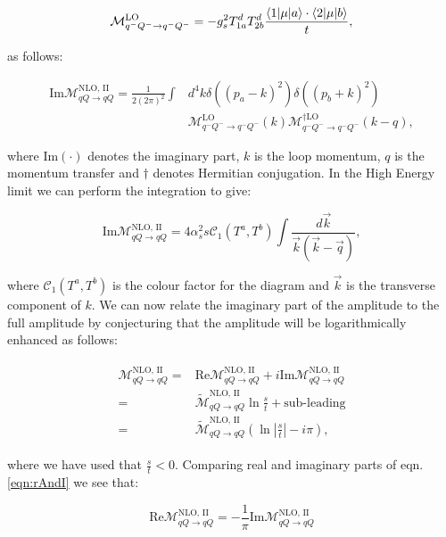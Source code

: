 		\begin{equation}
			\mathcal{M}_{q^-Q^-\rightarrow q^-Q^-}^{\text{LO}} = -g_s^2T^d_{1a}T^d_{2b}\frac{\langle 1 | \mu | a \rangle\cdot\langle 2 | \mu | b \rangle}{t},
		\end{equation}

		as follows:

		\begin{align}
			\text{Im}\mathcal{M}_{qQ\rightarrow qQ}^{\text{NLO, II}} = \frac{1}{2(2\pi)^2}\int &d^4k\delta((p_a-k)^2)
			\delta((p_b+k)^2)\\ &\mathcal{M}_{q^-Q^-\rightarrow q^-Q^-}^{\text{LO}}(k)
			\mathcal{M}_{q^-Q^-\rightarrow q^-Q^-}^{\dagger\text{LO}}(k-q),
		\end{align}

		where $\text{Im}(\cdot)$ denotes the imaginary part, $k$ is the loop momentum, $q$ is the momentum
		transfer and $\dagger$ denotes Hermitian conjugation.  In the High Energy limit we can perform the
		integration to give:

		\begin{equation}
			\text{Im}\mathcal{M}_{qQ\rightarrow qQ}^{\text{NLO, II}} = 4\alpha_s^2 s\mathcal{C}_1(T^a,T^b)
			\int \frac{d\vec{k}}{\vec{k}(\vec{k} - \vec{q})},
		\end{equation}

		where $\mathcal{C}_1(T^a,T^b)$ is the colour factor for the diagram and $\vec{k}$ is the transverse
		component of $k$.  We can now relate the imaginary part of the amplitude to the full amplitude by
		conjecturing that the amplitude will be logarithmically enhanced as follows:

		\begin{align}
		\begin{split}
			\mathcal{M}_{qQ\rightarrow qQ}^{\text{NLO, II}} = &\text{Re}\mathcal{M}_{qQ\rightarrow qQ}^{\text{NLO, II}} +
			i\text{Im}\mathcal{M}_{qQ\rightarrow qQ}^{\text{NLO, II}}\\
			=&\widetilde{\mathcal{M}}_{qQ\rightarrow qQ}^{\text{NLO, II}}\ln\frac{s}{t} + \text{sub-leading}\\
			=&\widetilde{\mathcal{M}}_{qQ\rightarrow qQ}^{\text{NLO, II}}\left(\ln\left|\frac{s}{t}\right| -i\pi\right),
			\label{eqn:rAndI}
		\end{split}
		\end{align}

		where we have used that $\frac{s}{t} < 0$.  Comparing real and imaginary parts of eqn. \eqref{eqn:rAndI} we see that:

		\begin{equation}
			\text{Re}\mathcal{M}_{qQ\rightarrow qQ}^{\text{NLO, II}} = -\frac{1}{\pi}\text{Im}\mathcal{M}_{qQ\rightarrow qQ}^{\text{NLO, II}}
		\end{equation}

